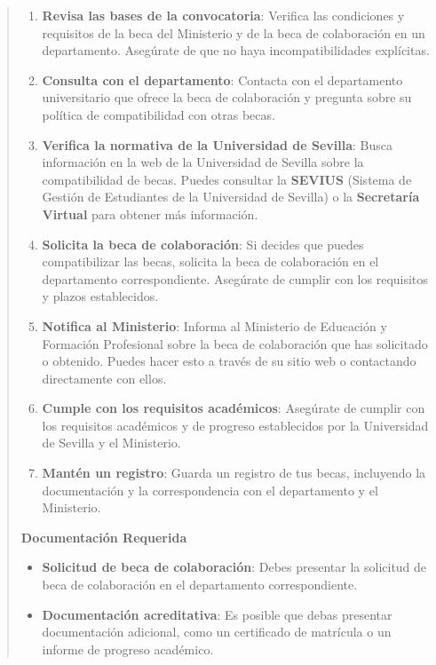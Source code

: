 \documentclass[12pt,a4paper,oneside]{report}
\begin{document}
\begin{itemize}
\begin{itemize}
\begin{quote}
\begin{enumerate}
  \item \textbf{Revisa las bases de la convocatoria}: Verifica las condiciones y requisitos de la beca del Ministerio y de la beca de colaboración en un departamento. Asegúrate de que no haya incompatibilidades explícitas.
  \item \textbf{Consulta con el departamento}: Contacta con el departamento universitario que ofrece la beca de colaboración y pregunta sobre su política de compatibilidad con otras becas.
  \item \textbf{Verifica la normativa de la Universidad de Sevilla}: Busca información en la web de la Universidad de Sevilla sobre la compatibilidad de becas. Puedes consultar la \textbf{SEVIUS} (Sistema de Gestión de Estudiantes de la Universidad de Sevilla) o la \textbf{Secretaría Virtual} para obtener más información.
  \item \textbf{Solicita la beca de colaboración}: Si decides que puedes compatibilizar las becas, solicita la beca de colaboración en el departamento correspondiente. Asegúrate de cumplir con los requisitos y plazos establecidos.
  \item \textbf{Notifica al Ministerio}: Informa al Ministerio de Educación y Formación Profesional sobre la beca de colaboración que has solicitado o obtenido. Puedes hacer esto a través de su sitio web o contactando directamente con ellos.
  \item \textbf{Cumple con los requisitos académicos}: Asegúrate de cumplir con los requisitos académicos y de progreso establecidos por la Universidad de Sevilla y el Ministerio.
  \item \textbf{Mantén un registro}: Guarda un registro de tus becas, incluyendo la documentación y la correspondencia con el departamento y el Ministerio.
\end{enumerate}


\noindent\textbf{Documentación Requerida}\\

\begin{itemize}
  \item \textbf{Solicitud de beca de colaboración}: Debes presentar la solicitud de beca de colaboración en el departamento correspondiente.
  \item \textbf{Documentación acreditativa}: Es posible que debas presentar documentación adicional, como un certificado de matrícula o un informe de progreso académico.
\end{itemize}


\end{quote}
\end{itemize}
\end{itemize}
\end{document}
